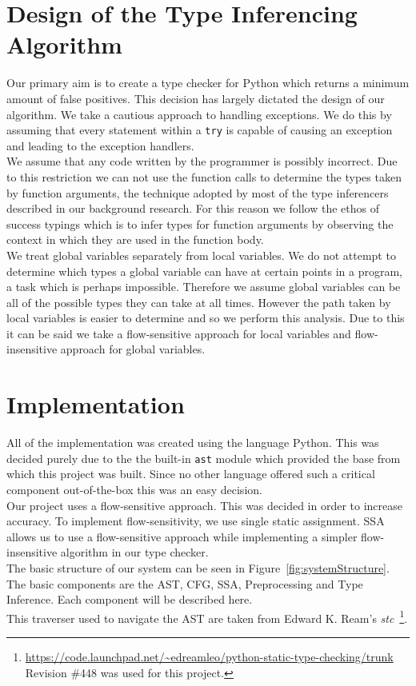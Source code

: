 \documentclass[12pt, titlepage]{article}
\begin{document}
\section{Design of the Type Inferencing Algorithm}
Our primary aim is to create a type checker for Python which returns a minimum amount of false positives. This decision has largely dictated the design of our algorithm. We take a cautious approach to handling exceptions. We do this by assuming that every statement within a \texttt{try} is capable of causing an exception and leading to the exception handlers. \\
\indent We assume that any code written by the programmer is possibly incorrect. Due to this restriction we can not use the function calls to determine the types taken by function arguments, the technique adopted by most of the type inferencers described in our background research. For this reason we follow the ethos of success typings which is to infer types for function arguments by observing the context in which they are used in the function body. \\
\indent We treat global variables separately from local variables. We do not attempt to determine which types a global variable can have at certain points in a program, a task which is perhaps impossible. Therefore we assume global variables can be all of the possible types they can take at all times. However the path taken by local variables is easier to determine and so we perform this analysis. Due to this it can be said we take a flow-sensitive approach for local variables and flow-insensitive approach for global variables.



\newpage
\section{Implementation}
All of the implementation was created using the language Python. This was decided purely due to the the built-in \texttt{ast} module which provided the base from which this project was built. Since no other language offered such a critical component out-of-the-box this was an easy decision. \\
\indent Our project uses a flow-sensitive approach. This was decided in order to increase accuracy. To implement flow-sensitivity, we use single static assignment. SSA allows us to use a flow-sensitive approach while implementing a simpler flow-insensitive algorithm in our type checker. \\
\indent The basic structure of our system can be seen in Figure~\ref{fig:systemStructure}. The basic components are the AST, CFG, SSA, Preprocessing and Type Inference. Each component will be described here. \\
\indent This traverser used to navigate the AST are taken from Edward K. Ream's \textit{stc}~\footnote{\url{https://code.launchpad.net/~edreamleo/python-static-type-checking/trunk} Revision \#448 was used for this project.}.
\end{document}
